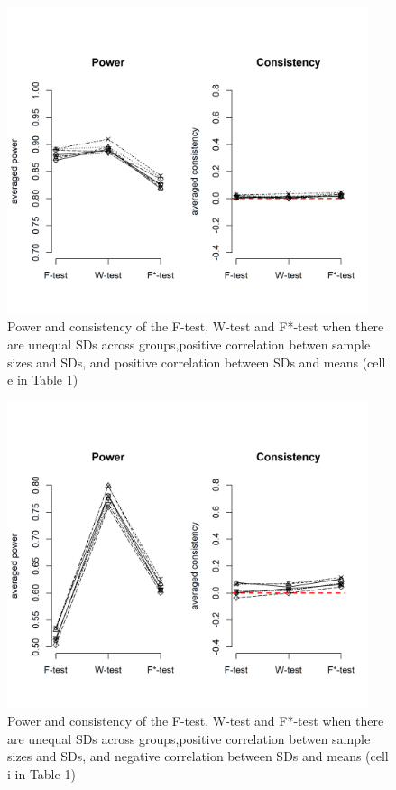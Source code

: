 \documentclass[man,floatsintext]{apa6}
\begin{document}
\begin{figure}
\includegraphics[width=400px]{Rmarkdown folder/Rmarkdown inputs/Fig2h} \caption{Power and consistency of the F-test, W-test and F*-test when there are unequal SDs across groups,positive correlation betwen sample sizes and SDs, and positive correlation between SDs and means (cell e  in Table 1)}\label{fig:unnamed-chunk-13}
\end{figure}

\begin{figure}
\includegraphics[width=400px]{Rmarkdown folder/Rmarkdown inputs/Fig2i} \caption{Power and consistency of the F-test, W-test and F*-test when there are unequal SDs across groups,positive correlation betwen sample sizes and SDs, and negative correlation between SDs and means (cell i  in Table 1)}\label{fig:unnamed-chunk-14}
\end{figure}
\end{document}
